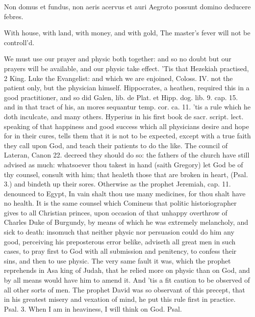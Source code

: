 {Non domus et fundus, non aeris acervus et auri
Aegroto possunt domino deducere febres.

With house, with land, with money, and with gold,
The master's fever will not be controll'd.

We must use our prayer and physic both together: and so no doubt but
our prayers will be available, and our physic take effect. 'Tis that
Hezekiah practised, 2 King.  Luke the Evangelist: and which we are
enjoined, Coloss. IV. not the patient only, but the physician himself.
Hippocrates, a heathen, required this in a good practitioner, and so
did Galen, lib. de Plat. et Hipp. dog. lib. 9. cap. 15. and in that
tract of his, an mores sequantur temp. cor. ca. 11. 'tis a rule which
he doth inculcate,  and many others. Hyperius in his first book
de sacr. script. lect. speaking of that happiness and good success
which all physicians desire and hope for in their cures, tells
them that it is not to be expected, except with a true faith they call
upon God, and teach their patients to do the like. The council of
Lateran, Canon 22. decreed they should do so: the fathers of the church
have still advised as much: whatsoever thou takest in hand (saith
Gregory) let God be of thy counsel, consult with him; that
healeth those that are broken in heart, (Psal.  3.) and bindeth
up their sores. Otherwise as the prophet Jeremiah, cap.  11.
denounced to Egypt, In vain shalt thou use many medicines, for thou
shalt have no health. It is the same counsel which Comineus that
politic historiographer gives to all Christian princes, upon occasion
of that unhappy overthrow of Charles Duke of Burgundy, by means of
which he was extremely melancholy, and sick to death: insomuch that
neither physic nor persuasion could do him any good, perceiving his
preposterous error belike, adviseth all great men in such cases,
to pray first to God with all submission and penitency, to
confess their sins, and then to use physic. The very same fault it was,
which the prophet reprehends in Asa king of Judah, that he relied more
on physic than on God, and by all means would have him to amend it. And
'tis a fit caution to be observed of all other sorts of men. The
prophet David was so observant of this precept, that in his greatest
misery and vexation of mind, he put this rule first in practice. Psal.
 3. When I am in heaviness, I will think on God. Psal. 
}
